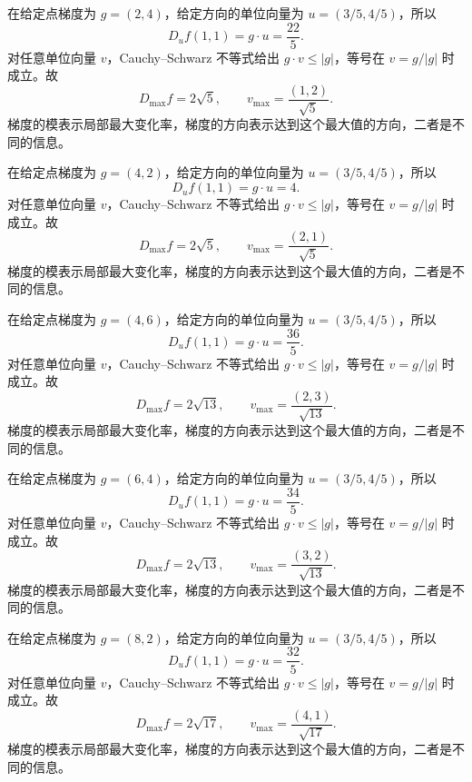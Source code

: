 \documentclass[UTF8,12pt,a4paper,fontset=fandol]{ctexart}
\begin{document}
\begin{solve}\label{ans:c34q8}
在给定点梯度为 $g=(2,4)$，给定方向的单位向量为 $u=(3/5,4/5)$，所以
\[
D_uf(1,1)=g\cdot u=\frac{22}{5}.
\]
对任意单位向量 $v$，Cauchy--Schwarz 不等式给出 $g\cdot v\le|g|$，等号在 $v=g/|g|$ 时成立。故
\[
D_{\max}f=2\sqrt{5},\qquad v_{\max}=\frac{(1,2)}{\sqrt{5}}.
\]
梯度的模表示局部最大变化率，梯度的方向表示达到这个最大值的方向，二者是不同的信息。
\end{solve}

\begin{solve}\label{ans:c34q9}
在给定点梯度为 $g=(4,2)$，给定方向的单位向量为 $u=(3/5,4/5)$，所以
\[
D_uf(1,1)=g\cdot u=4.
\]
对任意单位向量 $v$，Cauchy--Schwarz 不等式给出 $g\cdot v\le|g|$，等号在 $v=g/|g|$ 时成立。故
\[
D_{\max}f=2\sqrt{5},\qquad v_{\max}=\frac{(2,1)}{\sqrt{5}}.
\]
梯度的模表示局部最大变化率，梯度的方向表示达到这个最大值的方向，二者是不同的信息。
\end{solve}

\begin{solve}\label{ans:c34q10}
在给定点梯度为 $g=(4,6)$，给定方向的单位向量为 $u=(3/5,4/5)$，所以
\[
D_uf(1,1)=g\cdot u=\frac{36}{5}.
\]
对任意单位向量 $v$，Cauchy--Schwarz 不等式给出 $g\cdot v\le|g|$，等号在 $v=g/|g|$ 时成立。故
\[
D_{\max}f=2\sqrt{13},\qquad v_{\max}=\frac{(2,3)}{\sqrt{13}}.
\]
梯度的模表示局部最大变化率，梯度的方向表示达到这个最大值的方向，二者是不同的信息。
\end{solve}

\begin{solve}\label{ans:c34q11}
在给定点梯度为 $g=(6,4)$，给定方向的单位向量为 $u=(3/5,4/5)$，所以
\[
D_uf(1,1)=g\cdot u=\frac{34}{5}.
\]
对任意单位向量 $v$，Cauchy--Schwarz 不等式给出 $g\cdot v\le|g|$，等号在 $v=g/|g|$ 时成立。故
\[
D_{\max}f=2\sqrt{13},\qquad v_{\max}=\frac{(3,2)}{\sqrt{13}}.
\]
梯度的模表示局部最大变化率，梯度的方向表示达到这个最大值的方向，二者是不同的信息。
\end{solve}

\begin{solve}\label{ans:c34q12}
在给定点梯度为 $g=(8,2)$，给定方向的单位向量为 $u=(3/5,4/5)$，所以
\[
D_uf(1,1)=g\cdot u=\frac{32}{5}.
\]
对任意单位向量 $v$，Cauchy--Schwarz 不等式给出 $g\cdot v\le|g|$，等号在 $v=g/|g|$ 时成立。故
\[
D_{\max}f=2\sqrt{17},\qquad v_{\max}=\frac{(4,1)}{\sqrt{17}}.
\]
梯度的模表示局部最大变化率，梯度的方向表示达到这个最大值的方向，二者是不同的信息。
\end{solve}
\end{document}
